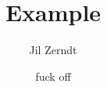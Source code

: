 \documentclass[a4paper, fontsize = 8pt, landscape]{scrartcl}
\title{Example}
\author{Jil Zerndt}
\date{fuck off}
\begin{document}
\begin{multicols}{3}
	\thispagestyle{TitlePageStyle}
	\maketitle
	\sffamily
	
    \raggedcolumns
\end{multicols}
\end{document}
